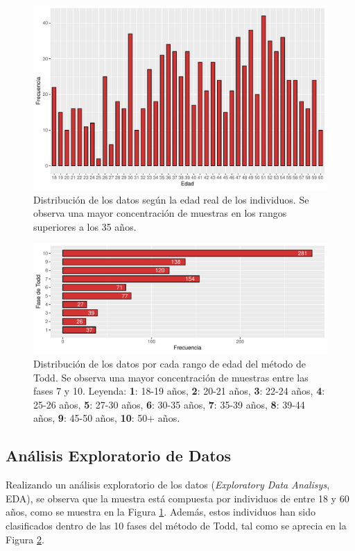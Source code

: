 \begin{figure}[h]
    \centering
    \includegraphics[width=\linewidth]{../../scripts/eda/eda_univar/char_age_distr.pdf}
    \caption[Distribución de los datos por edad]{Distribución de los datos según la edad real de los individuos. Se observa una mayor concentración de muestras en los rangos superiores a los 35 años.}
    \label{fig4:age}
\end{figure}
\begin{figure}[h]
    \centering
    \includegraphics[width=\linewidth]{../../scripts/eda/eda_univar/char_t_phase_distr.pdf}
    \caption[Distribución de los datos por cada rango de edad]{Distribución de los datos por cada rango de edad del método de Todd. Se observa una mayor concentración de muestras entre las fases 7 y 10. Leyenda: \textbf{1}: 18-19 años, \textbf{2}: 20-21 años, \textbf{3}: 22-24 años, \textbf{4}: 25-26 años, \textbf{5}: 27-30 años, \textbf{6}: 30-35 años, \textbf{7}: 35-39 años, \textbf{8}: 39-44 años, \textbf{9}: 45-50 años, \textbf{10}: 50+ años.}
    \label{fig4:todd_phase}
\end{figure}

\subsection{Análisis Exploratorio de Datos}
\label{section4:data_eda}
Realizando un análisis exploratorio de los datos (\textit{Exploratory Data Analisys}, EDA), se observa que la muestra está compuesta por individuos de entre 18 y 60 años, como se muestra en la Figura \ref{fig4:age}. Además, estos individuos han sido clasificados dentro de las 10 fases del método de Todd, tal como se aprecia en la Figura \ref{fig4:todd_phase}.

